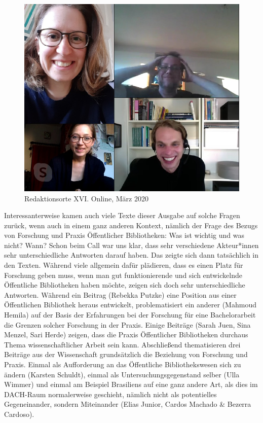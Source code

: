 \documentclass[a4paper,
fontsize=11pt,
oneside,
numbers=noperiodatend,
parskip=half-,
bibliography=totoc,
final
]{scrartcl}
\begin{document}
\begin{figure}
\centering
\includegraphics{img/redaktionscall3.jpeg}
\caption{Redaktionsorte XVI. Online, März 2020}
\end{figure}

Interessanterweise kamen auch viele Texte dieser Ausgabe auf solche
Fragen zurück, wenn auch in einem ganz anderen Kontext, nämlich der
Frage des Bezugs von Forschung und Praxis Öffentlicher Bibliotheken: Was
ist wichtig und was nicht? Wann? Schon beim Call war uns klar, dass sehr
verschiedene Akteur*innen sehr unterschiedliche Antworten darauf haben.
Das zeigte sich dann tatsächlich in den Texten. Während viele allgemein
dafür plädieren, dass es einen Platz für Forschung geben muss, wenn man
gut funktionierende und sich entwickelnde Öffentliche Bibliotheken haben
möchte, zeigen sich doch sehr unterschiedliche Antworten. Während ein
Beitrag (Rebekka Putzke) eine Position aus einer Öffentlichen Bibliothek
heraus entwickelt, problematisiert ein anderer (Mahmoud Hemila) auf der
Basis der Erfahrungen bei der Forschung für eine Bachelorarbeit die
Grenzen solcher Forschung in der Praxis. Einige Beiträge (Sarah Juen,
Sina Menzel, Sari Herde) zeigen, dass die Praxis Öffentlicher
Bibliotheken durchaus Thema wissenschaftlicher Arbeit sein kann.
Abschließend thematisieren drei Beiträge aus der Wissenschaft
grundsätzlich die Beziehung von Forschung und Praxis. Einmal als
Aufforderung an das Öffentliche Bibliothekswesen sich zu ändern (Karsten
Schuldt), einmal als Untersuchungsgegenstand selber (Ulla Wimmer) und
einmal am Beispiel Brasiliens auf eine ganz andere Art, als dies im
DACH-Raum normalerweise geschieht, nämlich nicht als potentielles
Gegeneinander, sondern Miteinander (Elias Junior, Cardos Machado \&
Bezerra Cardoso).
\end{document}
